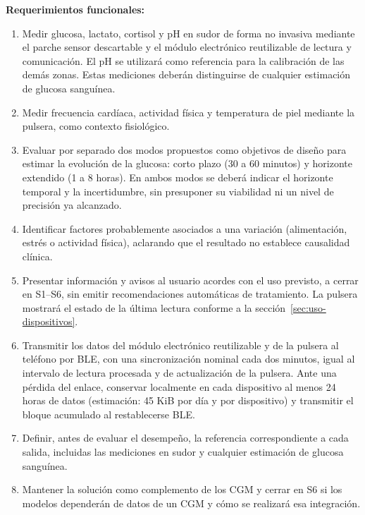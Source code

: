 \noindent\textbf{Requerimientos funcionales:}
\begin{enumerate}
    \item Medir glucosa, lactato, cortisol y pH en sudor de forma no invasiva mediante el parche sensor descartable y el módulo electrónico reutilizable de lectura y comunicación. El pH se utilizará como referencia para la calibración de las demás zonas. Estas mediciones deberán distinguirse de cualquier estimación de glucosa sanguínea.
    \item Medir frecuencia cardíaca, actividad física y temperatura de piel mediante la pulsera, como contexto fisiológico.
    \item Evaluar por separado dos modos propuestos como objetivos de diseño para estimar la evolución de la glucosa: corto plazo (30 a 60 minutos) y horizonte extendido (1 a 8 horas). En ambos modos se deberá indicar el horizonte temporal y la incertidumbre, sin presuponer su viabilidad ni un nivel de precisión ya alcanzado.
    \item Identificar factores probablemente asociados a una variación (alimentación, estrés o actividad física), aclarando que el resultado no establece causalidad clínica.
    \item Presentar información y avisos al usuario acordes con el uso previsto, a cerrar en S1--S6, sin emitir recomendaciones automáticas de tratamiento. La pulsera mostrará el estado de la última lectura conforme a la sección~\ref{sec:uso-dispositivos}.
    \item Transmitir los datos del módulo electrónico reutilizable y de la pulsera al teléfono por BLE, con una sincronización nominal cada dos minutos, igual al intervalo de lectura procesada y de actualización de la pulsera. Ante una pérdida del enlace, conservar localmente en cada dispositivo al menos 24 horas de datos (estimación: 45 KiB por día y por dispositivo) y transmitir el bloque acumulado al restablecerse BLE.
    \item Definir, antes de evaluar el desempeño, la referencia correspondiente a cada salida, incluidas las mediciones en sudor y cualquier estimación de glucosa sanguínea.
    \item Mantener la solución como complemento de los CGM y cerrar en S6 si los modelos dependerán de datos de un CGM y cómo se realizará esa integración.
\end{enumerate}

